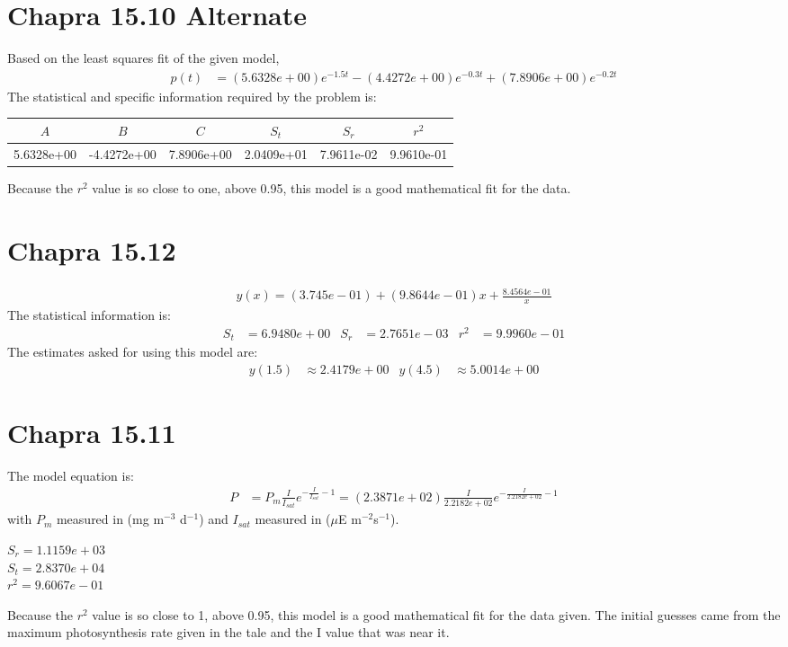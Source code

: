 \documentclass{article}
\begin{document}
\section{Chapra 15.10 Alternate}
Based on the least squares fit of the given model,
\begin{align*}
p(t)&=(5.6328e+00)e^{-1.5t} - (4.4272e+00)e^{-0.3t}+ (7.8906e+00)e^{-0.2t}
\end{align*}
The statistical and specific information required by the problem is:
\begin{center}
\begin{tabular}{|c|c|c|c|c|c|}\hline
$A$ & $B$ & $C$ & $S_t$ & $S_r$ & $r^2$\\ \hline
5.6328e+00 & -4.4272e+00  & 7.8906e+00 & 2.0409e+01 & 7.9611e-02 & 9.9610e-01 \\ \hline
\end{tabular}
\end{center}
Because the $r^2$ value is so close to one, above 0.95, this model is a good mathematical fit for the data.

\section{Chapra 15.12}
\begin{align*}
y(x) = (3.745e-01) + (9.8644e-01)x + \frac{8.4564e-01}{x}
\end{align*}
The statistical information is:
\begin{align*}
S_t&= 6.9480e+00 & S_r &=2.7651e-03  & r^2 &=9.9960e-01
\end{align*}
The estimates asked for using this model are:
\begin{align*}
y(1.5)&\approx 2.4179e+00 & y(4.5)&\approx 5.0014e+00
\end{align*}

\section{Chapra 15.11}
The model equation is:
\begin{align*}
P&=P_m\frac{I}{I_{sat}}e^{-\frac{I}{I_{sat}}-1}=
(2.3871e+02)\frac{I}{2.2182e+02}e^{-\frac{I}{2.2182e+02}-1}
\end{align*}
with $P_m$ measured in (mg m$^{-3}$ d$^{-1}$) and $I_{sat}$ measured in ($\mu$E m$^{-2}$s$^{-1}$).\\
\begin{center}
$S_r = 1.1159e+03 $\\     $S_t = 2.8370e+04$\\     $r^2 = 9.6067e-01$\\
\end{center}
Because the $r^2$ value is so close to 1, above 0.95, this model is a good mathematical fit for the data given. The initial guesses came from the maximum photosynthesis rate given in the tale and the I value that was near it.
\end{document}
